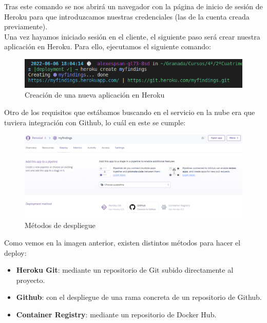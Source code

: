 Tras este comando se nos abrirá un navegador con la página de inicio de sesión de Heroku
para que introduzcamos nuestras credenciales (las de la cuenta creada previamente).\\

Una vez hayamos iniciado sesión en el cliente, el siguiente paso será crear nuestra
aplicación en Heroku. Para ello, ejecutamos el siguiente comando:

    \begin{figure}[H]
        \centering
        \includegraphics[scale=0.55]{imagenes/heroku-create.png}
        \caption{Creación de una nueva aplicación en Heroku}
        \label{fig:heroku-create}
    \end{figure}

Otro de los requisitos que estábamos buscando en el servicio en la nube era que tuviera
integración con Github, lo cuál en este se cumple:

    \begin{figure}[H]
        \centering
        \includegraphics[scale=0.29]{imagenes/deployment-method.png}
        \caption{Métodos de despliegue}
        \label{fig:deployment-method}
    \end{figure}

Como vemos en la imagen anterior, existen distintos métodos para hacer el deploy:

    \begin{itemize}
        \item \textbf{Heroku Git}: mediante un repositorio de Git subido directamente
        al proyecto.
        \item \textbf{Github}: con el despliegue de una rama concreta de un repositorio
        de Github.
        \item \textbf{Container Registry}: mediante un repositorio de Docker Hub.
    \end{itemize}

